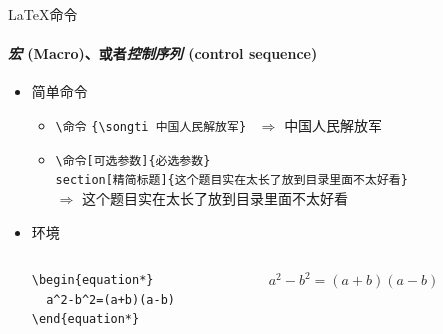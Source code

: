 \begin{frame}[fragile]{\LaTeX{}命令}
  \framesubtitle{\emph{宏} (Macro)、或者\emph{控制序列} (control sequence)}
\begin{itemize}
\item 简单命令
  \begin{itemize}
    \item \verb|\命令|\hspace{2em}
    \verb|{\songti 中国人民解放军}| ~$\Rightarrow$ {\songti 中国人民解放军}
  \item \verb|\命令[可选参数]{必选参数}|\\
\verb|section[精简标题]{这个题目实在太长了放到目录里面不太好看}|\\
$\Rightarrow$ { \hspace{1em} \songti 这个题目实在太长了放到目录里面不太好看}
  \end{itemize}
\item 环境
  \begin{columns}[c]
  \begin{column}{0.45\textwidth}
    \begin{lstlisting}[basicstyle=\ttfamily]
\begin{equation*}
  a^2-b^2=(a+b)(a-b)
\end{equation*}
\end{lstlisting}
\end{column}\hspace{1em}
  \begin{column}{0.45\textwidth}
$ a^2-b^2=(a+b)(a-b)$
\end{column}
  \end{columns}
\end{itemize}
\end{frame}

